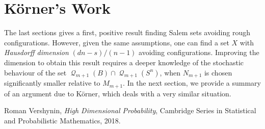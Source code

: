 \documentclass[12pt,reqno]{article}
\numberwithin{equation}{section}
\DeclareMathOperator{\DQ}{\mathcal{Q}}
\begin{document}
\begin{comment}
It is easy to see from our proof that for each $m$,
%
\[ \#(\DQ_m(X_m)) = \frac{1}{(M_1 \dots M_m)^d}. \]
%
Thus
%
\begin{align*}
    \log_{1/l_m}(\#(\DQ_m(X_m))) &= \frac{d \log(M_1 \dots M_m)}{\log(N_1 \dots N_m)}\\
    &\sim \frac{d \log(M_m)}{\log(N_m)}\\
    &= \frac{d \log(M_m)}{\log(M_m) + \log(K_m)}\\
    &= \frac{d}{1 + \log_{M_m}(K_m)}\\
    &\sim \frac{d}{1 + \left(\frac{s}{dn - s} + c\varepsilon \right)}\\
    &= \frac{d}{\frac{dn}{dn - s} + c\varepsilon_m}.
\end{align*}
%
Thus
%
\[ \lim_{m \to \infty} \log_{1/l_m}(\#(\DQ_m(X_m))) \leq \frac{dn - s}{n}. \]
%
In particular, this means $X$ has lower Minkowski dimension at most $(dn - s)/n$, which, together with the Fourier dimension bound, implies that $X$ is Salem.
\end{comment}

\section{K\"{o}rner's Work}

The last sections gives a first, positive result finding Salem sets avoiding rough configurations. However, given the same assumptions, one can find a set $X$ with \emph{Hausdorff dimension} $(dn - s)/(n-1)$ avoiding configurations. Improving the dimension to obtain this result requires a deeper knowledge of the stochastic behaviour of the set $\DQ_{m+1}(B) \cap \DQ_{m+1}(S^n)$, when $N_{m+1}$ is chosen significantly smaller relative to $M_{m+1}$. In the next section, we provide a summary of an argument due to K\"{o}rner, which deals with a very similar situation.

\begin{thebibliography}{9}

    Roman Vershynin,
    \textit{High Dimensional Probability},
    Cambridge Series in Statistical and Probabilistic Mathematics,
    2018.

\end{thebibliography}
\end{document}
